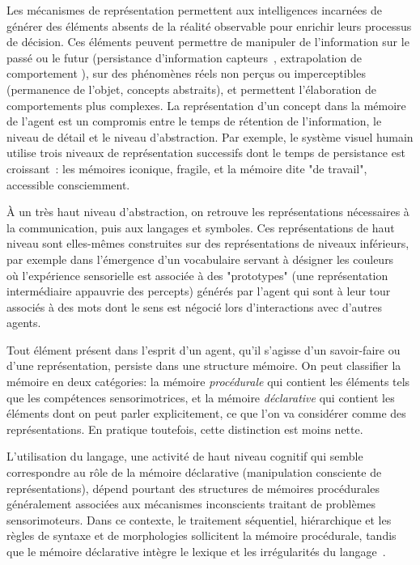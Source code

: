 Les mécanismes de représentation permettent aux intelligences incarnées de générer des éléments absents de la réalité observable pour enrichir leurs processus de décision. Ces éléments peuvent permettre de manipuler de l'information sur le passé ou le futur (persistance d'information capteurs~\cite{dorigo1994robot}, extrapolation de comportement \cite{gay2023intersubjectivity}), sur des phénomènes réels non perçus ou imperceptibles (permanence de l'objet, concepts abstraits), et permettent l'élaboration de comportements plus complexes. La représentation d'un concept dans la mémoire de l'agent est un compromis entre le temps de rétention de l'information, le niveau de détail et le niveau d'abstraction. Par exemple, le système visuel humain utilise trois niveaux de représentation
successifs dont le temps de persistance est croissant~\cite{vandenbroucke2014accurate}: les mémoires iconique, fragile, et la mémoire dite "de travail", accessible consciemment.

À un très haut niveau d'abstraction, on retrouve les représentations nécessaires à la communication, puis aux langages et symboles. Ces représentations de haut niveau sont elles-mêmes construites sur des représentations de niveaux inférieurs, par exemple dans l'émergence d'un vocabulaire servant à désigner les couleurs~\cite{steels2008symbol} où l'expérience sensorielle est associée à des "prototypes" (une représentation intermédiaire appauvrie des percepts) générés par l'agent qui sont à leur tour associés à des mots dont le sens est négocié lors d'interactions avec d'autres agents.

Tout élément présent dans l'esprit d'un agent, qu'il s'agisse d'un savoir-faire ou d'une représentation, persiste dans une structure mémoire. On peut classifier la mémoire en deux catégories: la mémoire \emph{procédurale} qui contient les éléments tels que les compétences sensorimotrices, et la mémoire \emph{déclarative} qui contient les éléments dont on peut parler explicitement, ce que l'on va considérer comme des représentations. En pratique toutefois, cette distinction est moins nette. 

L'utilisation du langage, une activité de haut niveau cognitif qui semble correspondre au rôle de la mémoire déclarative (manipulation consciente de représentations), dépend pourtant des structures de mémoires procédurales généralement associées aux mécanismes inconscients traitant de problèmes sensorimoteurs. Dans ce contexte, le traitement séquentiel, hiérarchique et les règles de syntaxe et de morphologies sollicitent la mémoire procédurale, tandis que le mémoire déclarative intègre le lexique et les irrégularités du langage~\cite{pilicontributions}.

